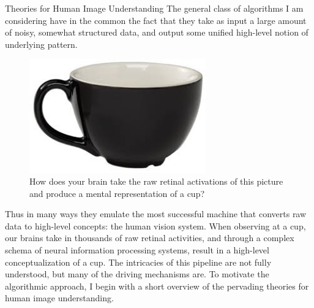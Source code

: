 \documentclass[12pt]{pom_thesis}
\begin{document}
\begin{chapter}{Theories for Human Image Understanding}
	The general class of algorithms I am considering have in the common the fact that they take as input a large amount of noisy, somewhat structured data, and output some unified high-level notion of underlying pattern. 
	\begin{figure}[h]
		\label{cup}
		\centering
		\includegraphics[width=3in]{cup}
		\caption{How does your brain take the raw retinal activations of this picture and produce a mental representation of a cup?}
	\end{figure}
	Thus in many ways they emulate the most successful machine that converts raw data to high-level concepts: the human vision system. When observing at a cup, our brains take  in thousands of raw retinal activities, and through a complex schema of neural information processing systems, result in a high-level conceptualization of a cup. The intricacies of this pipeline are not fully understood, but many of the driving mechanisms are. To motivate the algorithmic approach, I begin with a short overview of the pervading theories for human image understanding. 


\end{chapter}
\end{document}
